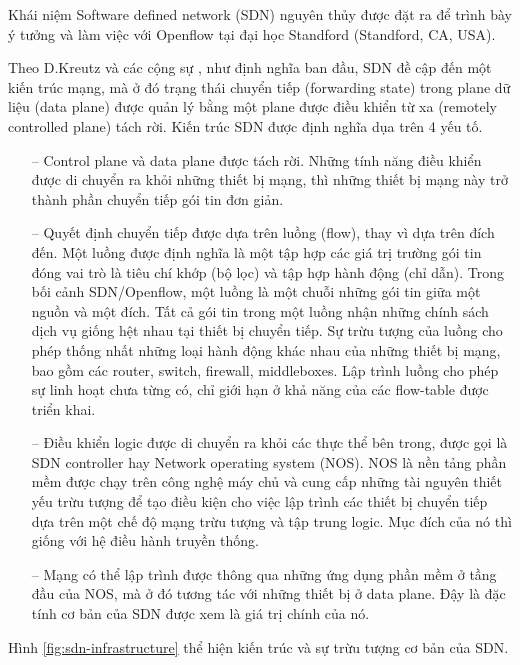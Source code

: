Khái niệm Software defined network (SDN) nguyên thủy được đặt ra để trình bày ý tưởng và làm việc với Openflow \cite{13-McKeown} tại đại học Standford (Standford, CA, USA).

Theo D.Kreutz và các cộng sự \cite{11-Kreutz}, như định  nghĩa ban đầu, SDN đề cập đến một kiến trúc mạng, mà ở đó trạng thái chuyển tiếp (forwarding state) trong plane dữ liệu (data plane) được quản lý bằng  một plane được điều khiển từ xa (remotely controlled plane) tách rời. Kiến trúc SDN được định nghĩa dụa trên 4 yếu tố.

\begin{itemize}
\item[--] Control plane và data plane được tách rời. Những tính năng điều khiển được di chuyển ra khỏi những thiết bị mạng, thì những thiết bị mạng này trở thành phần chuyển tiếp gói tin đơn giản.
\item[--] Quyết định chuyển tiếp được dựa trên luồng (flow), thay vì dựa trên đích đến. Một luồng được định nghĩa là một tập hợp các giá trị trường gói tin đóng vai trò là tiêu chí khớp (bộ lọc) và tập hợp hành động (chỉ dẫn). Trong bối cảnh SDN/Openflow, một luồng là một chuỗi những gói tin giữa một nguồn và một đích. Tất cả gói tin trong một luồng nhận những chính sách dịch vụ giống hệt nhau tại thiết bị chuyển tiếp. Sự trừu tượng của luồng cho phép thống nhất những loại hành động khác nhau của những thiết bị mạng, bao gồm các router, switch, firewall, middleboxes. Lập trình luồng cho phép sự linh hoạt chưa từng có, chỉ giới hạn ở khả năng của các flow-table được triển khai.
\item[--] Điều khiển logic được di chuyển ra khỏi các thực thể bên trong, được gọi là SDN controller hay Network operating system (NOS). NOS là nền tảng phần mềm được chạy trên công nghệ máy chủ và cung cấp những tài nguyên thiết yếu trừu tượng để tạo điều kiện cho việc lập trình các thiết bị chuyển tiếp dựa trên một chế độ mạng trừu tượng và tập trung logic. Mục đích của nó thì giống với hệ điều hành truyền thống.
\item[--] Mạng có thể lập trình được thông qua những ứng dụng phần mềm ở tầng đầu của NOS, mà ở đó tương tác với những thiết bị ở data plane. Đậy là đặc tính cơ bản của SDN được xem là giá trị chính của nó. 
\end{itemize}

Hình \ref{fig:sdn-infrastructure} thể hiện kiến trúc và sự trừu tượng cơ bản của SDN.

